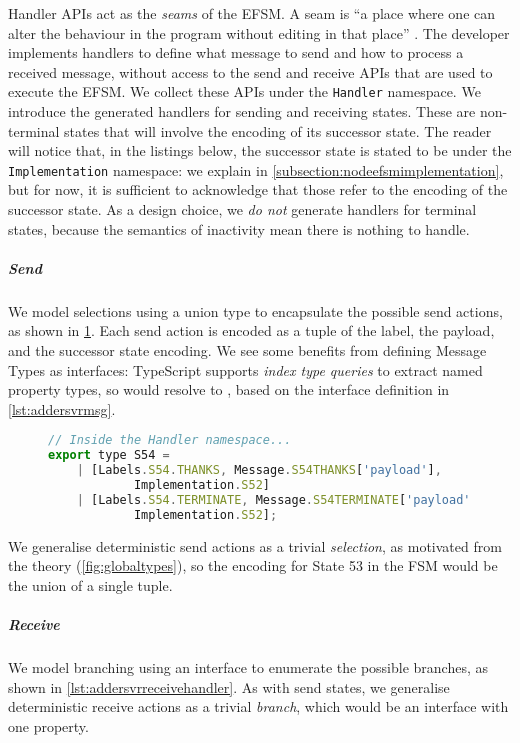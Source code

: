 Handler APIs act as the \textit{seams} of the EFSM.
A seam is ``a place where one can alter the
behaviour in the program without editing in that place''
\cite{seam}. The developer implements handlers
to define what message to send and how to process a received
message, without access to the send and receive APIs
that are used to execute the EFSM.
We collect these APIs under the \texttt{Handler} namespace. 
We introduce the generated handlers for sending and receiving states.
These are non-terminal states that will involve the encoding of its
successor state. The reader will notice that, in the listings below,
the successor state is stated to be under the
\texttt{Implementation} namespace: we explain in 
\cref{subsection:nodeefsmimplementation}, but for now,
it is sufficient to acknowledge that those refer to the encoding
of the successor state.
As a design choice, we \textit{do not} generate handlers for
terminal states, because the semantics of inactivity mean
there is nothing to handle.

\subparagraph{Send}
We model selections using a union type to
encapsulate the possible send actions, as shown in 
\cref{lst:addersvrsendhandler}.
Each send action is encoded as a tuple of
the label, the payload, and the successor state encoding.
We see some benefits from defining Message Types as interfaces:
TypeScript supports \textit{index type queries} to extract
named property types, so
would resolve to \lstonelinejs{[string]},
based on the interface definition in \cref{lst:addersvrmsg}.

\begin{figure}[!ht]
\begin{lstlisting}[language=javascript, tabsize=2]
// Inside the Handler namespace...
export type S54 = 
	| [Labels.S54.THANKS, Message.S54THANKS['payload'],
			Implementation.S52] 
	| [Labels.S54.TERMINATE, Message.S54TERMINATE['payload'], 
			Implementation.S52];
\end{lstlisting}
\label{lst:addersvrsendhandler}
\end{figure}

We generalise deterministic send actions as a trivial \textit{selection}, 
as motivated from the theory (\cref{fig:globaltypes}),
so the encoding for State 53 in the  FSM would be
the union of a single tuple.

\subparagraph{Receive}
We model branching using an interface to 
enumerate the possible branches, as shown in
\cref{lst:addersvrreceivehandler}.
As with send states,
we generalise deterministic receive actions as a trivial \textit{branch},
which would be an interface with one property. 

